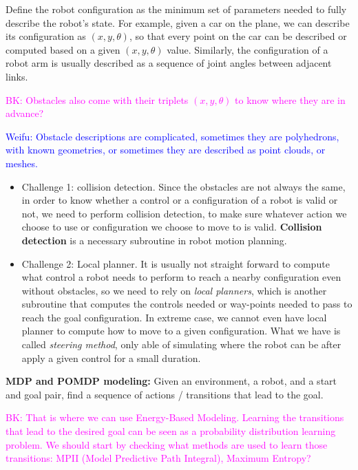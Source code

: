 \documentclass{article}
\begin{document}
Define the robot configuration as the minimum set of parameters needed to fully describe the robot's state. For example, given a car on the plane, we can describe its configuration as $(x, y, \theta)$, so that every point on the car can be described or computed based on a given $(x, y, \theta)$ value. Similarly, the configuration of a robot arm is usually described as a sequence of joint angles between adjacent links. 

\textcolor{magenta}{BK: Obstacles also come with their triplets $(x, y, \theta)$ to know where they are in advance?}

\textcolor{blue}{Weifu: Obstacle descriptions are complicated, sometimes they are polyhedrons, with known geometries, or sometimes they are described as point clouds, or meshes. }

\begin{itemize}
    
\item Challenge 1: collision detection. Since the obstacles are not always the same, in order to know whether a control or a configuration of a robot is valid or not, we need to perform collision detection, to make sure whatever action we choose to use or configuration we choose to move to is valid. \textbf{Collision detection} is a necessary subroutine in robot motion planning. 

\item Challenge 2: Local planner. It is usually not straight forward to compute what control a robot needs to perform to reach a nearby configuration even without obstacles, so we need to rely on {\em local planners}, which is another subroutine that computes the controls needed or way-points needed to pass to reach the goal configuration. 
In extreme case, we cannot even have local planner to compute how to move to a given configuration. What we have is called \emph{steering method}, only able of simulating where the robot can be after apply a given control for a small duration.


\end{itemize}

\noindent\textbf{MDP and POMDP modeling:} Given an environment, a robot, and a start and goal pair, find a sequence of actions / transitions that lead to the goal. 

\textcolor{magenta}{BK: That is where we can use Energy-Based Modeling. Learning the transitions that lead to the desired goal can be seen as a probability distribution learning problem.
We should start by checking what methods are used to learn those transitions: MPII (Model Predictive Path Integral), Maximum Entropy? }
\end{document}
